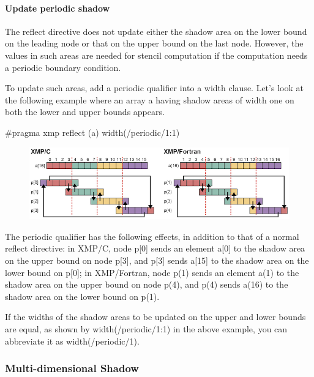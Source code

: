 \paragraph{Update periodic shadow}

The reflect directive does not update either the shadow area on the
lower bound on the leading node or that on the upper bound on the last
node. However, the values in such areas are needed for stencil
computation if the computation needs a periodic boundary condition.

To update such areas, add a periodic qualifier into a width
clause. Let’s look at the following example where an array a having
shadow areas of width one on both the lower and upper bounds appears.

\begin{XCexample}
#pragma xmp reflect (a) width(/periodic/1:1)
\end{XCexample}


\begin{figure}
  \centering
  \includegraphics{figs/reflect_periodic.png}
\end{figure}

The periodic qualifier has the following effects, in addition to that of
a normal reflect directive: in XMP/C, node p[0] sends an element a[0] to
the shadow area on the upper bound on node p[3], and p[3] sends a[15] to
the shadow area on the lower bound on p[0]; in XMP/Fortran, node p(1)
sends an element a(1) to the shadow area on the upper bound on node
p(4), and p(4) sends a(16) to the shadow area on the lower bound on
p(1).

\begin{mynote}
If the widths of the shadow areas to be updated on
the upper and lower 
bounds are equal, as shown by width(/periodic/1:1) in the above example,
you can abbreviate it as width(/periodic/1).
\end{mynote}

\subsubsection{Multi-dimensional Shadow}

